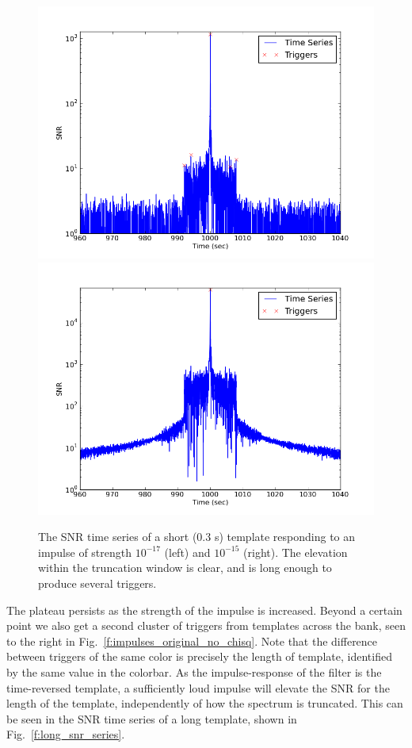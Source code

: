 \begin{figure}
  \includegraphics[width=0.5\linewidth]{figures/detchar/snrs_17_short}
  \includegraphics[width=0.5\linewidth]{figures/detchar/snrs_15_short}
  \caption[SNR time series of a short template and loud impulse] {
The SNR time series of a short (0.3 s) template responding to an
impulse of strength $10^{-17}$ (left) and $10^{-15}$ (right).  The
elevation within the truncation window is clear, and is long enough to
produce several triggers.
  \label{f:short_snr_series}
}
\end{figure}%

The plateau persists as the strength of the impulse is increased.
Beyond a certain point we also get a second cluster of triggers
from templates across the bank, seen to the right in
Fig.~\ref{f:impulses_original_no_chisq}.  Note that the difference
between triggers of the same color is precisely the length of
template, identified by the same value in the colorbar.  As the
impulse-response of the filter is the time-reversed template, a
sufficiently loud impulse will elevate the SNR for the length of the
template, independently of how the spectrum is truncated.   This can
be seen in the SNR time series of a long template, shown in
Fig.~\ref{f:long_snr_series}.


